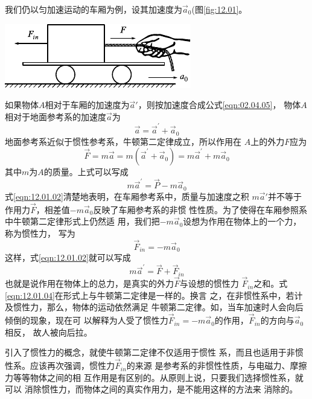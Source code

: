 我们仍以匀加速运动的车厢为例，设其加速度为$ \vec{a} _ { 0 } $(图\ref{fig:12.01}。
\begin{figurex}
    \centering
    \includegraphics{figure/fig12.01}
    \caption{}
    \label{fig:12.01}
\end{figurex}
如果物体$ A $相对于车厢的加速度为$ \vec{a}' $，则按加速度合成公式\eqref{eqn:02.04.05}，
物体$ A $相对于地面参考系的加速度$ \vec{a} $为
\begin{equation}\label{eqn:12.01.01}
    \vec{a} = \vec{a} ^ { \prime } + \vec{a} _ { 0 }
\end{equation}
地面参考系近似于惯性参考系，牛顿第二定律成立，所以作用在
$ A $上的外力$ F $应为
\begin{equation*}
    \vec{F} = m \vec{a} = m \left( \vec{a} ^ { \prime } + \vec{a} _ { 0 } \right) = m \vec{a} ^ { \prime } + m \vec{a} _ { 0 }
\end{equation*}
其中$ m $为$ A $的质量。上式可以写成
\begin{equation}\label{eqn:12.01.02}
    m \vec{a} ^ { \prime } = \vec{P} - m \vec{a} _ { 0 }
\end{equation}
式\eqref{eqn:12.01.02}清楚地表明，在车厢参考系中，质量与加速度之积
$ m \vec{a} ' $并不等于作用力$\vec{F}$，相差值$ - m \vec{a} _ 0 $反映了车厢参考系的非惯
性性质。为了使得在车厢参照系中牛顿第二定律形式上仍然适
用，我们把$-m\vec{a}_0$设想为作用在物体上的一个力，称为惯性力，
写为
\begin{equation}\label{eqn:12.01.03}
    \vec{F} _ { in } = - m \vec{a} _ { 0 }
\end{equation}
这样，式\eqref{eqn:12.01.02}就可以写成
\begin{equation}\label{eqn:12.01.04}
    m \vec{a} ^ { \prime } = \vec{F} + \vec{F} _ {in}
\end{equation}
也就是说作用在物体上的总力，是真实的外力$\vec{F}$与设想的惯性力
$\vec{F}_{in}$之和。式\eqref{eqn:12.01.04}在形式上与牛顿第二定律是一样的。换言
之，在非惯性系中，若计及惯性力，那么，物体的运动依然满足
牛顿第二定律。如，当车加速时人会向后倾倒的现象，现在可
以解释为人受了惯性力$ \vec{F}_{in}=-m\vec{a}_0 $的作用，$\vec{F}_{in}$的方向与$\vec{a}_0$相反，
故人被向后拉。

引入了惯性力的概念，就使牛顿第二定律不仅适用于惯性
系，而且也适用于非惯性系。应该再次强调，惯性力$ \vec{F}_{in} $的来源
是参考系的非惯性性质，与电磁力、摩擦力等等物体之间的相
互作用是有区别的。从原则上说，只要我们选择惯性系，就可以
消除惯性力，而物体之间的真实作用力，是不能用这样的方法来
消除的。

